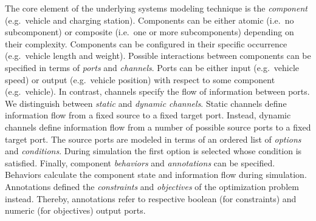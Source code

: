 The core element of the underlying systems modeling technique is the \textit{component} (e.g.\ vehicle and charging station). Components can be either atomic (i.e.\ no subcomponent) or composite (i.e.\ one or more subcomponents) depending on their complexity. Components can be configured in their specific occurrence (e.g.\ vehicle length and weight). Possible interactions between components can be specified in terms of \textit{ports} and \textit{channels}. Ports can be either input (e.g.\ vehicle speed) or output (e.g.\ vehicle position) with respect to some component (e.g.\ vehicle). In contrast, channels specify the flow of information between ports. We distinguish between \textit{static} and \textit{dynamic channels}. Static channels define information flow from a fixed source to a fixed target port. Instead, dynamic channels define information flow from a number of possible source ports to a fixed target port. The source ports are modeled in terms of an ordered list of \textit{options} and \textit{conditions}. During simulation the first option is selected whose condition is satisfied. Finally, component \textit{behaviors} and \textit{annotations} can be specified. Behaviors calculate the component state and information flow during simulation. Annotations defined the \textit{constraints} and \textit{objectives} of the optimization problem instead. Thereby, annotations refer to respective boolean (for constraints) and numeric (for objectives) output ports.